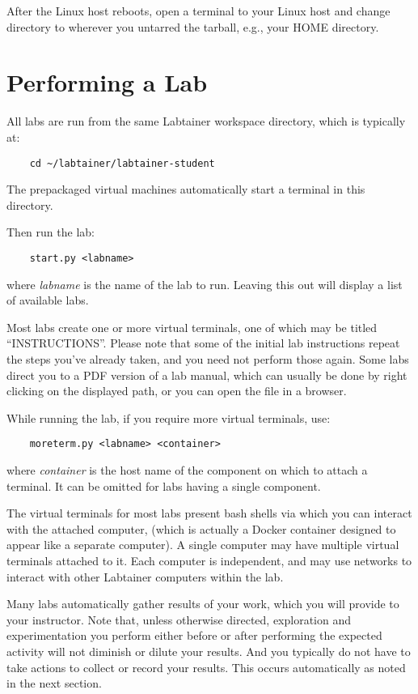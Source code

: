\documentclass[12pt]{article}
\begin{document}
After the Linux host reboots, open a terminal to your Linux host and
change directory to wherever you untarred the tarball, e.g., your HOME directory.

\section{Performing a Lab}
All labs are run from the same Labtainer workspace directory, which is typically at:
\begin{verbatim}
    cd ~/labtainer/labtainer-student
\end{verbatim}
\noindent The prepackaged virtual machines automatically start a terminal in this directory.

Then run the lab:
\begin{verbatim}
    start.py <labname>
\end{verbatim}
\noindent where \textit{labname} is the name of the lab to run.  Leaving this out will 
display a list of available labs.  

Most labs create one or more virtual terminals, one of which may be titled ``INSTRUCTIONS''.
Please note that some of the initial lab instructions repeat the steps you've already taken, and you need
not perform those again.  Some labs direct you to a PDF version of a lab manual, which can usually 
be done by right clicking on the displayed path, or you can open the file in a browser.

While running the lab, if you require more virtual terminals, use:
\begin{verbatim}
    moreterm.py <labname> <container>
\end{verbatim}
\noindent where \textit{container} is the host name of the component on which to attach a terminal.  
It can be omitted for labs having a single component.

The virtual terminals for most labs present bash shells via which you can interact
with the attached computer, (which is actually a Docker container designed to appear
like a separate computer).  A single computer
may have multiple virtual terminals attached to it.  Each computer is independent, and 
may use networks to interact with other Labtainer computers within the lab.  

Many labs automatically gather results of your work, which you will provide to your instructor.
Note that, unless otherwise directed, exploration and experimentation you perform either before
or after performing the expected activity will not diminish or dilute your results.  And you typically
do not have to take actions to collect or record your results.  This occurs automatically as noted in the 
next section.  
\end{document}
